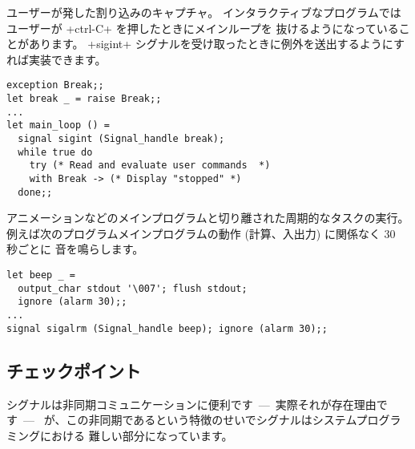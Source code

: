 \begin{example}
ユーザーが発した割り込みのキャプチャ。
インタラクティブなプログラムではユーザーが \ml+ctrl-C+ を押したときにメインループを
抜けるようになっていることがあります。
\ml+sigint+ シグナルを受け取ったときに例外を送出するようにすれば実装できます。
%
\begin{lstlisting}
exception Break;;
let break _ = raise Break;;
...
let main_loop () =
  signal sigint (Signal_handle break);
  while true do
    try (* Read and evaluate user commands  *)
    with Break -> (* Display "stopped" *)
  done;;
\end{lstlisting}
\end{example}

\begin{example}
\label{ex/beep}
アニメーションなどのメインプログラムと切り離された周期的なタスクの実行。
例えば次のプログラムメインプログラムの動作 (計算、入出力) に関係なく 30 秒ごとに  音を鳴らします。

\begin{lstlisting}
let beep _ =
  output_char stdout '\007'; flush stdout;
  ignore (alarm 30);;
...
signal sigalrm (Signal_handle beep); ignore (alarm 30);;
\end{lstlisting}
\end{example}

\subsection*{チェックポイント}

シグナルは非同期コミュニケーションに便利です~---~実際それが存在理由です~---~
が、この非同期であるという特徴のせいでシグナルはシステムプログラミングにおける
難しい部分になっています。


